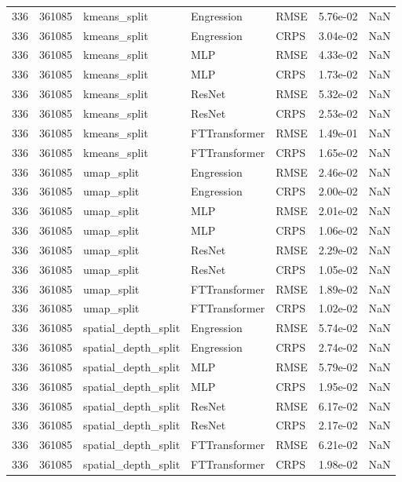 \begin{tabular}{rrlllrr}
336 & 361085 & kmeans\_split & Engression & RMSE & 5.76e-02 & NaN \\
336 & 361085 & kmeans\_split & Engression & CRPS & 3.04e-02 & NaN \\
336 & 361085 & kmeans\_split & MLP & RMSE & 4.33e-02 & NaN \\
336 & 361085 & kmeans\_split & MLP & CRPS & 1.73e-02 & NaN \\
336 & 361085 & kmeans\_split & ResNet & RMSE & 5.32e-02 & NaN \\
336 & 361085 & kmeans\_split & ResNet & CRPS & 2.53e-02 & NaN \\
336 & 361085 & kmeans\_split & FTTransformer & RMSE & 1.49e-01 & NaN \\
336 & 361085 & kmeans\_split & FTTransformer & CRPS & 1.65e-02 & NaN \\
336 & 361085 & umap\_split & Engression & RMSE & 2.46e-02 & NaN \\
336 & 361085 & umap\_split & Engression & CRPS & 2.00e-02 & NaN \\
336 & 361085 & umap\_split & MLP & RMSE & 2.01e-02 & NaN \\
336 & 361085 & umap\_split & MLP & CRPS & 1.06e-02 & NaN \\
336 & 361085 & umap\_split & ResNet & RMSE & 2.29e-02 & NaN \\
336 & 361085 & umap\_split & ResNet & CRPS & 1.05e-02 & NaN \\
336 & 361085 & umap\_split & FTTransformer & RMSE & 1.89e-02 & NaN \\
336 & 361085 & umap\_split & FTTransformer & CRPS & 1.02e-02 & NaN \\
336 & 361085 & spatial\_depth\_split & Engression & RMSE & 5.74e-02 & NaN \\
336 & 361085 & spatial\_depth\_split & Engression & CRPS & 2.74e-02 & NaN \\
336 & 361085 & spatial\_depth\_split & MLP & RMSE & 5.79e-02 & NaN \\
336 & 361085 & spatial\_depth\_split & MLP & CRPS & 1.95e-02 & NaN \\
336 & 361085 & spatial\_depth\_split & ResNet & RMSE & 6.17e-02 & NaN \\
336 & 361085 & spatial\_depth\_split & ResNet & CRPS & 2.17e-02 & NaN \\
336 & 361085 & spatial\_depth\_split & FTTransformer & RMSE & 6.21e-02 & NaN \\
336 & 361085 & spatial\_depth\_split & FTTransformer & CRPS & 1.98e-02 & NaN \\

\end{tabular}
